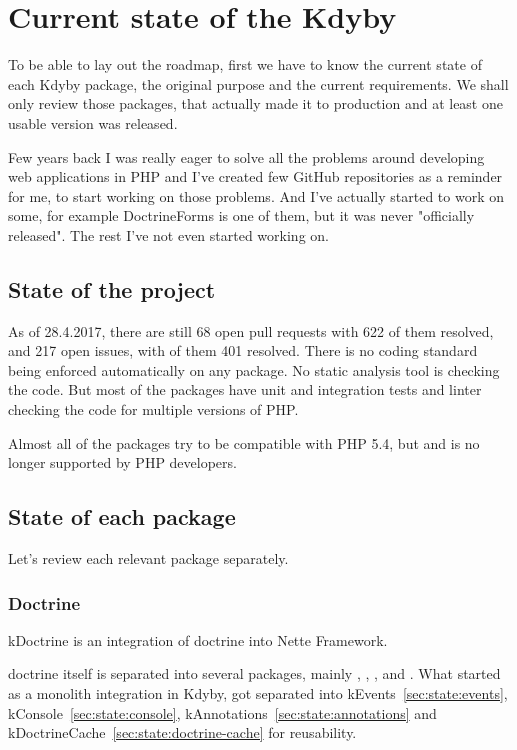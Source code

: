 \chapter{Current state of the Kdyby}

To be able to lay out the roadmap, first we have to know the current state of each Kdyby package, the original purpose and the current requirements. We shall only review those packages, that actually made it to production and at least one usable version was released.

Few years back I was really eager to solve all the problems around developing web applications in PHP and I've created few GitHub repositories as a reminder for me, to start working on those problems. And I've actually started to work on some, for example DoctrineForms is one of them, but it was never "officially released". The rest I've not even started working on.

\section{State of the project}

As of 28.4.2017, there are still 68 open pull requests with 622 of them resolved, and 217 open issues, with of them 401 resolved. There is no coding standard being enforced automatically on any package. No static analysis tool is checking the code. But most of the packages have unit and integration tests and linter checking the code for multiple versions of PHP.

Almost all of the packages try to be compatible with PHP 5.4, but  and is no longer supported by PHP developers.

\section{State of each package}

Let's review each relevant package separately.

\subsection{Doctrine} \label{sec:state:doctrine}

\gls{kDoctrine} is an integration of \gls{doctrine} into Nette Framework.

\gls{doctrine} itself is separated into several packages, mainly , , ,  and . What started as a monolith integration in Kdyby, got separated into \gls{kEvents}~\ref{sec:state:events}, \gls{kConsole}~\ref{sec:state:console}, \gls{kAnnotations}~\ref{sec:state:annotations} and \gls{kDoctrineCache}~\ref{sec:state:doctrine-cache} for reusability.

